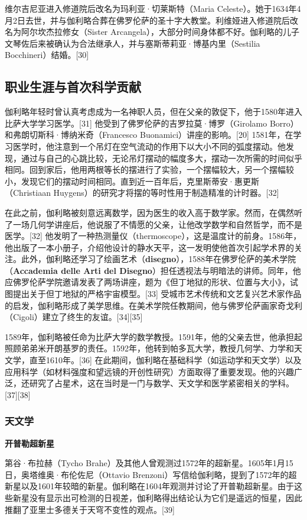 维尔吉尼亚进入修道院后改名为玛利亚·切莱斯特（Maria Celeste）。她于1634年4月2日去世，并与伽利略合葬在佛罗伦萨的圣十字大教堂。利维娅进入修道院后改名为阿尔坎杰拉修女（Sister Arcangela），大部分时间身体都不好。伽利略的儿子文琴佐后来被确认为合法继承人，并与塞斯蒂莉亚·博基内里（Sestilia Bocchineri）结婚。[30]  
\subsection{职业生涯与首次科学贡献}
伽利略年轻时曾认真考虑成为一名神职人员，但在父亲的敦促下，他于1580年进入比萨大学学习医学。[31] 他受到了佛罗伦萨的吉罗拉莫·博罗（Girolamo Borro）和弗朗切斯科·博纳米奇（Francesco Buonamici）讲座的影响。[20] 1581年，在学习医学时，他注意到一个吊灯在空气流动的作用下以大小不同的弧度摆动。他发现，通过与自己的心跳比较，无论吊灯摆动的幅度多大，摆动一次所需的时间似乎相同。回到家后，他用两根等长的摆进行了实验，一个摆幅较大，另一个摆幅较小，发现它们的摆动时间相同。直到近一百年后，克里斯蒂安·惠更斯（Christiaan Huygens）的研究才将摆的等时性用于制造精准的计时器。[32]  

在此之前，伽利略被刻意远离数学，因为医生的收入高于数学家。然而，在偶然听了一场几何学讲座后，他说服了不情愿的父亲，让他改学数学和自然哲学，而不是医学。[32] 他发明了一种热测量仪（thermoscope），这是温度计的前身。1586年，他出版了一本小册子，介绍他设计的静水天平，这一发明使他首次引起学术界的关注。此外，伽利略还学习了绘画艺术（\textbf{disegno}），1588年在佛罗伦萨的美术学院（\textbf{Accademia delle Arti del Disegno}）担任透视法与明暗法的讲师。同年，他应佛罗伦萨学院邀请发表了两场讲座，题为《但丁地狱的形状、位置与大小》，试图提出关于但丁地狱的严格宇宙模型。[33] 受城市艺术传统和文艺复兴艺术家作品的启发，伽利略形成了美学思维。在美术学院任教期间，他与佛罗伦萨画家奇戈利（Cigoli）建立了终生的友谊。[34][35]  

1589年，伽利略被任命为比萨大学的数学教授。1591年，他的父亲去世，他承担起照顾弟弟米开朗基罗的责任。1592年，他转到帕多瓦大学，教授几何学、力学和天文学，直至1610年。[36] 在此期间，伽利略在基础科学（如运动学和天文学）以及应用科学（如材料强度和望远镜的开创性研究）方面取得了重要发现。他的兴趣广泛，还研究了占星术，这在当时是一门与数学、天文学和医学紧密相关的学科。[37][38]
\subsubsection{天文学} 
\textbf{开普勒超新星}  

第谷·布拉赫（Tycho Brahe）及其他人曾观测过1572年的超新星。1605年1月15日，奥塔维奥·布伦佐尼（Ottavio Brenzoni）写信给伽利略，提到了1572年的超新星以及1601年较暗的新星。伽利略在1604年观测并讨论了开普勒超新星。由于这些新星没有显示出可检测的日视差，伽利略得出结论认为它们是遥远的恒星，因此推翻了亚里士多德关于天穹不变性的观点。[39]

